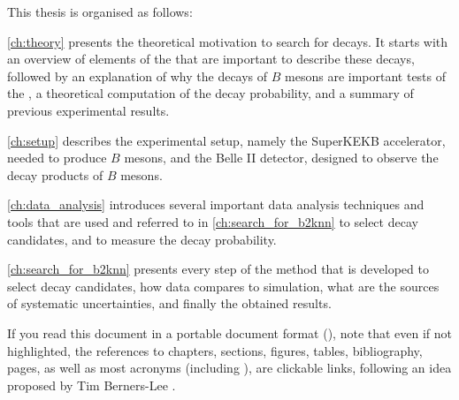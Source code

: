 This thesis is organised as follows:
\bi
\item \cref{ch:theory} presents the theoretical motivation to search for \BKnn decays.
It starts with an overview of elements of the \SM that are important to describe these decays, followed by an explanation of why the decays of $B$ mesons are important tests of the \SM, a theoretical computation of the \BKnn decay probability, and a summary of previous experimental results.
\item \cref{ch:setup} describes the experimental setup, namely the SuperKEKB accelerator, needed to produce $B$ mesons, and the Belle II detector, designed to observe the decay products of $B$ mesons.
\item \cref{ch:data_analysis} introduces several important data analysis techniques and tools that are used and referred to in \cref{ch:search_for_b2knn} to select \BKnn decay candidates, and to measure the decay probability. 
\item \cref{ch:search_for_b2knn} presents every step of the method that is developed to select \BKnn decay candidates, how data compares to simulation, what are the sources of systematic uncertainties, and finally the obtained results.
\ei

If you read this document in a portable document format (\pdf), note that even if not highlighted, the references to chapters, sections, figures, tables, bibliography, pages, as well as most acronyms (including \pdf), are clickable links, following an idea proposed by Tim Berners-Lee \cite{www}.
